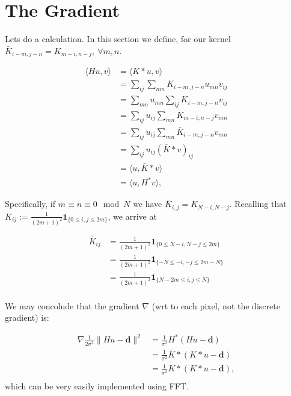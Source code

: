 \documentclass[paper=a4, fontsize=11pt]{scrartcl} %
\numberwithin{equation}{section} %
\numberwithin{figure}{section} %
\numberwithin{table}{section} %
\newcommand{\data}{\mathbf{d}}
\begin{document}



\section{The Gradient}
Lets do a calculation. In this section we define, for our kernel
$\bar{K}_{i-m,j-n} = K_{m-i,n-j}, \ \forall m,n$.

\begin{align*}
  \langle Hu,v \rangle &= \langle K * u, v \rangle\\
  &= \sum_{ij} \sum_{mn} K_{i-m,j-n}u_{mn} v_{ij} \\
  &= \sum_{mn} u_{mn} \sum_{ij} K_{i-m,j-n} v_{ij} \\
  &= \sum_{ij} u_{ij} \sum_{mn} K_{m-i,n-j} v_{mn} \\
  &= \sum_{ij} u_{ij} \sum_{mn} \bar{K}_{i-m,j-n} v_{mn} \\
  &= \sum_{ij} u_{ij} (\bar{K} * v)_{ij} \\
  &= \langle u , \bar{K} *v \rangle \\
  &= \langle u, H^{*} v \rangle,
\end{align*}

Specifically, if $m \equiv n \equiv 0 \mod N$ we have $\bar{K}_{i,j} =
K_{N-i,N-j}$. Recalling that $K_{ij} := \frac{1}{ (2m+1)^2 }
\mathbf{1}_{\{ 0 \leq i,j \leq 2m \} }$, we arrive at

\begin{align*}
  \bar{K}_{ij} &= \frac{1}{ (2m+1)^2 } \mathbf{1}_{\{ 0 \leq N-i,N-j \leq 2m \} } \\
  &= \frac{1}{ (2m+1)^2 } \mathbf{1}_{\{ -N \leq -i,-j \leq 2m -N\} } \\
  &= \frac{1}{ (2m+1)^2 } \mathbf{1}_{\{ N-2m \leq i,j \leq N \} } \\
\end{align*}

We may concolude that the gradient $\nabla$ (wrt to each pixel, not
the discrete gradient) is:

\begin{align*}
  \nabla \frac{1}{2\sigma^2} \|Hu - \data \|^2 &= \frac{1}{\sigma^2} H^{*}(Hu - \data ) \\
  &= \frac{1}{\sigma^2} \bar{K} * (K*u - \data )\\
  &= \frac{1}{\sigma^2} K * (K*u - \data),\\
\end{align*}
which can be very easily implemented using FFT.
\end{document}
